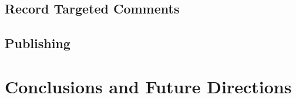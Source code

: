 \documentclass[12pt,a4paper,twoside]{report}
\begin{document}
    \subsection{Record Targeted Comments}
      \label{sec:notes}
      

    \subsection{Publishing}
      \label{sec:pub}
      

  \clearpage

  \section{Conclusions and Future Directions}
    \label{sec:outro}
    

  
  
\end{document}
